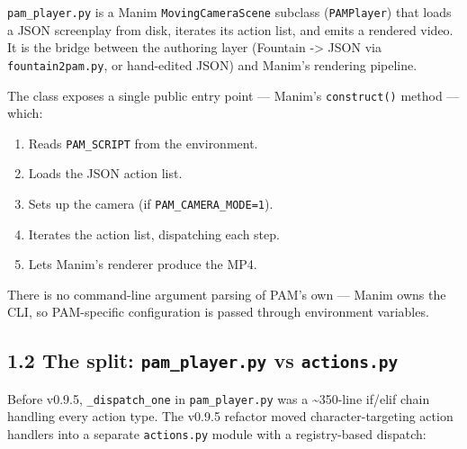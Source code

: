\documentclass[
  11pt,
]{book}
\providecommand{\tightlist}{%
  \setlength{\itemsep}{0pt}\setlength{\parskip}{0pt}}
\begin{document}
\texttt{pam\_player.py} is a Manim \texttt{MovingCameraScene} subclass
(\texttt{PAMPlayer}) that loads a JSON screenplay from disk, iterates
its action list, and emits a rendered video. It is the bridge between
the authoring layer (Fountain -\textgreater{} JSON via
\texttt{fountain2pam.py}, or hand-edited JSON) and Manim's rendering
pipeline.

The class exposes a single public entry point --- Manim's
\texttt{construct()} method --- which:

\begin{enumerate}
\def\labelenumi{\arabic{enumi}.}
\tightlist
\item
  Reads \texttt{PAM\_SCRIPT} from the environment.
\item
  Loads the JSON action list.
\item
  Sets up the camera (if \texttt{PAM\_CAMERA\_MODE=1}).
\item
  Iterates the action list, dispatching each step.
\item
  Lets Manim's renderer produce the MP4.
\end{enumerate}

There is no command-line argument parsing of PAM's own --- Manim owns
the CLI, so PAM-specific configuration is passed through environment
variables.

\subsection{\texorpdfstring{1.2 The split: \texttt{pam\_player.py} vs
\texttt{actions.py}}{1.2 The split: pam\_player.py vs actions.py}}\label{the-split-pam_player.py-vs-actions.py}

Before v0.9.5, \texttt{\_dispatch\_one} in \texttt{pam\_player.py} was a
\textasciitilde350-line if/elif chain handling every action type. The
v0.9.5 refactor moved character-targeting action handlers into a
separate \texttt{actions.py} module with a registry-based dispatch:
\end{document}
